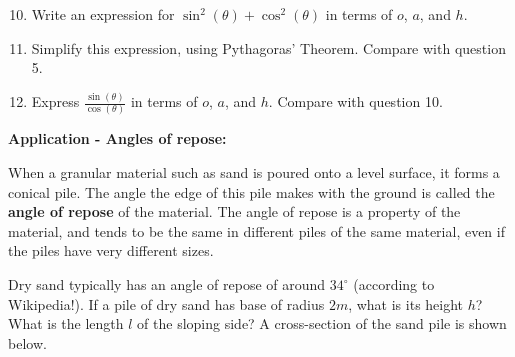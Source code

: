 \documentclass{article}
\begin{document}
\begin{center}
\end{center}


\begin{enumerate}
\setcounter{enumi}{9}
\item Write an expression for $\sin^2(\theta)+\cos^2(\theta)$ in terms of $o$, $a$, and $h$.
\item Simplify this expression, using Pythagoras' Theorem. Compare with question 5.
\item Express $\frac{\sin(\theta)}{\cos(\theta)}$ in terms of $o$, $a$, and $h$. Compare with question 10.
\end{enumerate}

\clearpage

{\bf Application - Angles of repose:}

\vspace{5mm}

When a granular material such as sand is poured onto a level surface, it forms a conical pile. The angle the edge of this pile makes with the ground is called the {\bf angle of repose} of the material. The angle of repose is a property of the material, and tends to be the same in different piles of the same material, even if the piles have very different sizes.

Dry sand typically has an angle of repose of around $34^\circ$ (according to Wikipedia!). If a pile of dry sand has base of radius $2m$, what is its height $h$? What is the length $l$ of the sloping side? A cross-section of the sand pile is shown below.

\begin{center}
\end{center}

\clearpage
\end{document}
